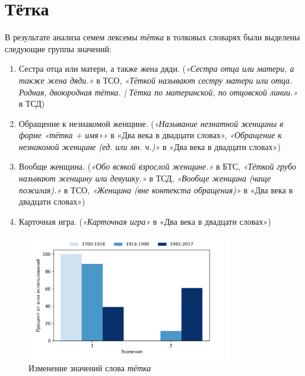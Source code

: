 \section*{Тётка}

В результате анализа семем лексемы \textit{тётка} в толковых словарях были выделены следующие группы значений:

\begin{enumerate}
    \item Сестра отца или матери, а также жена дяди.
    (\textit{«Сестра отца или матери, а также жена дяди.»} в ТСО,
    \textit{«Тёткой называют сестру матери или отца. Родная, двоюродная тётка. | Тётка по материнской, по отцовской линии.»} в ТСД)

    \item Обращение к незнакомой женщине.
    (\textit{«Называние незнатной женщины в форме «тётка + имя»»} в «Два века в двадцати словах»,
    \textit{«Обращение к незнакомой женщине (ед. или мн. ч.)»} в «Два века в двадцати словах»)

    \item Вообще женщина.
    (\textit{«Обо всякой взрослой женщине.»} в БТС,
    \textit{«Тёткой грубо называют женщину или девушку.»} в ТСД,
    \textit{«Вообще женщина (чаще пожилая).»} в ТСО,
    \textit{«Женщина (вне контекста обращения)»} в «Два века в двадцати словах»)

%
    \item Карточная игра.
    (\textit{«Карточная игра»} в «Два века в двадцати словах»)
\end{enumerate}

\begin{figure}[H]
	\centering
	\includegraphics[width=0.8\textwidth]{img/visualizations/tetka_minimal}
	\caption{Изменение значений слова \textit{тётка}}
	\label{fig:Тётка}
\end{figure}

